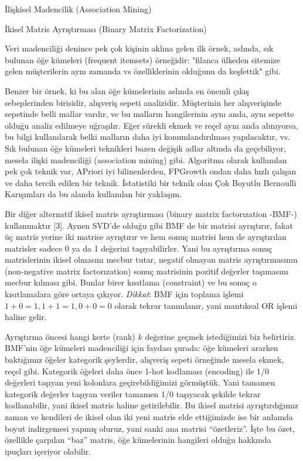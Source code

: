 \documentclass[12pt,fleqn]{article}\usepackage{../../common}
\begin{document}
İlişkisel Madencilik (Association Mining)

İkisel Matris Ayrıştırması (Binary Matrix Factorization)

Veri madenciliği denince pek çok kişinin aklına gelen ilk örnek, aslında,
sık bulunan öğe kümeleri (frequent itemsets) örneğidir: "filanca ülkeden
sitemize gelen müşterilerin aynı zamanda vs özelliklerinin olduğunu da
keşfettik" gibi. 

Benzer bir örnek, ki bu alan öğe kümelerinin aslında en önemli çıkış
sebeplerinden birisidir, alışveriş sepeti analizidir. Müşterinin her
alışverişinde sepetinde belli mallar vardır, ve bu malların hangilerinin aynı
anda, aynı sepette olduğu analiz edilmeye uğraşılır. Eğer sürekli ekmek ve reçel
aynı anda alınıyorsa, bu bilgi kullanılarak belki malların daha iyi
konumlandırılması yapılacaktır, vs. Sık bulunan öğe kümeleri teknikleri bazen
değişik adlar altında da geçebiliyor, mesela ilişki madenciliği (association
mining) gibi. Algoritma olarak kullanılan pek çok teknik var, APriori iyi
bilinenlerden, FPGrowth ondan daha hızlı çalışan ve daha tercih edilen bir
teknik. İstatistiki bir teknik olan Çok Boyutlu Bernoulli Karışımları da bu
alanda kullanılan bir yaklaşım.

Bir diğer alternatif ikisel matris ayrıştırması (binary matrix
factorızation -BMF-) kullanmaktır [3]. Aynen SVD'de olduğu gibi BMF de bir
matrisi ayrıştırır, fakat üç matris yerine iki matrise ayrıştırır ve hem
sonuç matrisi hem de ayrıştırılan matrisler sadece 0 ya da 1 değerini
taşıyabilirler. Yani bu ayrıştırma sonuç matrislerinin ikisel olmasını
mecbur tutar, negatif olmayan matris ayrıştırmasının (non-negative matrix
factorızation) sonuç matrisinin pozitif değerler taşımasını mecbur kılması
gibi. Bunlar birer kısıtlama (constraint) ve bu sonuç o kısıtlamalara göre
ortaya çıkıyor. {\em Dikkat}: BMF için toplama işlemi $1+0 = 1, 1+1=1, 0+0
= 0$ olarak tekrar tanımlanır, yani mantıksal OR işlemi haline gelir.

Ayrıştırma öncesi hangi kerte (rank) $k$ değerine geçmek istediğimizi biz
belirtiriz. BMF'nin öğe kümeleri madenciliği için faydası şurada: öğe
kümeleri ararken baktığımız öğeler kategorik şeylerdir, alışveriş sepeti
örneğinde mesela ekmek, reçel gibi. Kategorik öğeleri daha önce 1-hot
kodlaması (encoding) ile 1/0 değerleri taşıyan yeni kolonlara
geçirebildiğimizi görmüştük. Yani tamamen kategorik değerler taşıyan
veriler tamamen 1/0 taşıyacak şekilde tekrar kodlanabilir, yani ikisel
matris haline getirilebilir. Bu ikisel matrisi ayrıştırdığımız zaman ve
kendileri de ikisel olan iki yeni matris elde ettiğimizde ise bir anlamda
boyut indirgemesi yapmış oluruz, yani sanki ana matrisi ``özetleriz''. İşte
bu özet, özellikle çarpılan ``baz'' matris, öğe kümelerinin hangileri
olduğu hakkında ipuçları içeriyor olabilir.
\end{document}
